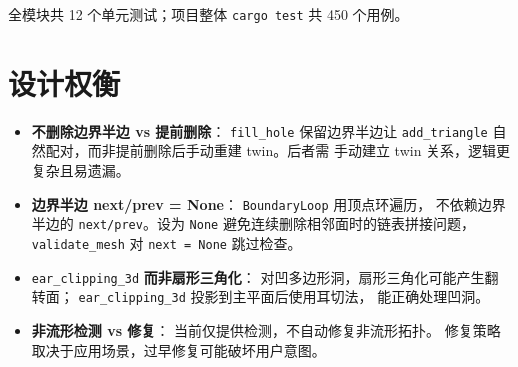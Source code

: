 \documentclass[11pt,a4paper]{article}
\begin{document}
全模块共 12 个单元测试；项目整体 \texttt{cargo test} 共 450 个用例。

\section{设计权衡}

\begin{itemize}
  \item \textbf{不删除边界半边 vs 提前删除}：
        \texttt{fill\_hole} 保留边界半边让 \texttt{add\_triangle}
        自然配对，而非提前删除后手动重建 twin。后者需
        手动建立 twin 关系，逻辑更复杂且易遗漏。

  \item \textbf{边界半边 next/prev = None}：
        \texttt{BoundaryLoop} 用顶点环遍历，
        不依赖边界半边的 \texttt{next/prev}。设为
        \texttt{None} 避免连续删除相邻面时的链表拼接问题，
        \texttt{validate\_mesh} 对 \texttt{next = None} 跳过检查。

  \item \texttt{ear\_clipping\_3d} \textbf{而非扇形三角化}：
        对凹多边形洞，扇形三角化可能产生翻转面；
        \texttt{ear\_clipping\_3d} 投影到主平面后使用耳切法，
        能正确处理凹洞。

  \item \textbf{非流形检测 vs 修复}：
        当前仅提供检测，不自动修复非流形拓扑。
        修复策略取决于应用场景，过早修复可能破坏用户意图。
\end{itemize}
\end{document}

